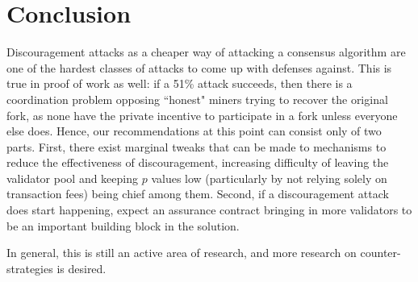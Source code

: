 \documentclass[12pt]{article}
\begin{document}
\section{Conclusion}

Discouragement attacks as a cheaper way of attacking a consensus algorithm are one of the hardest classes of attacks to come up with defenses against. This is true in proof of work as well: if a 51\% attack succeeds, then there is a coordination problem opposing ``honest" miners trying to recover the original fork, as none have the private incentive to participate in a fork unless everyone else does. Hence, our recommendations at this point can consist only of two parts. First, there exist marginal tweaks that can be made to mechanisms to reduce the effectiveness of discouragement, increasing difficulty of leaving the validator pool and keeping $p$ values low (particularly by not relying solely on transaction fees) being chief among them. Second, if a discouragement attack does start happening, expect an assurance contract bringing in more validators to be an important building block in the solution.

In general, this is still an active area of research, and more research on counter-strategies is desired.



\end{document}
